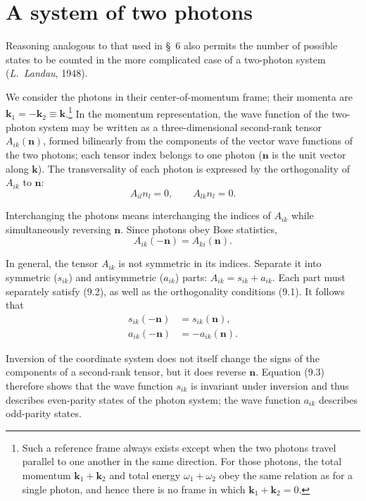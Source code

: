 
\section{A system of two photons}

Reasoning analogous to that used in \S~6 also permits the number of possible states to be counted in the more complicated case of a two-photon system (\emph{L.~Landau}, 1948).

We consider the photons in their center-of-momentum frame; their momenta are $\mathbf{k}_1=-\mathbf{k}_2\equiv\mathbf{k}$.\footnote{Such a reference frame always exists except when the two photons travel parallel to one another in the same direction. For those photons, the total momentum $\mathbf{k}_1+\mathbf{k}_2$ and total energy $\omega_1+\omega_2$ obey the same relation as for a single photon, and hence there is no frame in which $\mathbf{k}_1+\mathbf{k}_2=0$.} In the momentum representation, the wave function of the two-photon system may be written as a three-dimensional second-rank tensor $A_{ik}(\mathbf{n})$, formed bilinearly from the components of the vector wave functions of the two photons; each tensor index belongs to one photon ($\mathbf{n}$ is the unit vector along $\mathbf{k}$). The transversality of each photon is expressed by the orthogonality of $A_{ik}$ to $\mathbf{n}$:
\begin{equation}
A_{il}n_l=0,
\qquad
A_{lk}n_l=0.
\tag{9.1}
\end{equation}

Interchanging the photons means interchanging the indices of $A_{ik}$ while simultaneously reversing $\mathbf{n}$. Since photons obey Bose statistics,
\begin{equation}
A_{ik}(-\mathbf{n})=A_{ki}(\mathbf{n}).
\tag{9.2}
\end{equation}

In general, the tensor $A_{ik}$ is not symmetric in its indices. Separate it into symmetric ($s_{ik}$) and antisymmetric ($a_{ik}$) parts: $A_{ik}=s_{ik}+a_{ik}$. Each part must separately satisfy (9.2), as well as the orthogonality conditions (9.1). It follows that
\begin{align}
s_{ik}(-\mathbf{n})&=s_{ik}(\mathbf{n}),
\tag{9.3}\\
a_{ik}(-\mathbf{n})&=-a_{ik}(\mathbf{n}).
\tag{9.4}
\end{align}

Inversion of the coordinate system does not itself change the signs of the components of a second-rank tensor, but it does reverse $\mathbf{n}$. Equation (9.3) therefore shows that the wave function $s_{ik}$ is invariant under inversion and thus describes even-parity states of the photon system; the wave function $a_{ik}$ describes odd-parity states.

